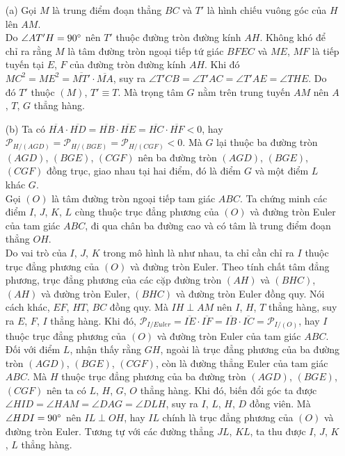     \begin{solution}
        \hfill
        \begin{enumerate}
            \item[(a)] Gọi \(M\) là trung điểm đoạn thẳng \(BC\) và \(T'\) là hình chiếu vuông góc của \(H\) lên \(AM\).\\
            Do \(\angle AT'H = 90 \degree\) nên \(T'\) thuộc đường tròn đường kính \(AH\). Không khó để chỉ ra rằng \(M\) là tâm đường tròn ngoại tiếp tứ giác \(BFEC\) và \(ME\), \(MF\) là tiếp tuyến tại \(E\), \(F\) của đường tròn đường kính \(AH\). Khi đó \(MC^2 = ME^2 = \overline{MT'} \cdot \overline{MA}\), suy ra \(\angle T'CB = \angle T'AC = \angle T'AE = \angle THE\). Do đó \(T'\) thuộc \((M)\), \(T' \equiv T\). Mà trọng tâm \(G\) nằm trên trung tuyến \(AM\) nên \(A\), \(T\), \(G\) thẳng hàng.
            \item[(b)] Ta có \(\overline{HA} \cdot \overline{HD} = \overline{HB} \cdot \overline{HE} = \overline{HC} \cdot \overline{HF} < 0\), hay \(\mathcal{P}_{H/(AGD)} = \mathcal{P}_{H/(BGE)} = \mathcal{P}_{H/(CGF)} < 0\). Mà \(G\) lại thuộc ba đường tròn \((AGD)\), \((BGE)\), \((CGF)\) nên ba đường tròn \((AGD)\), \((BGE)\), \((CGF)\) đồng trục, giao nhau tại hai điểm, đó là điểm \(G\) và một điểm \(L\) khác \(G\).\\
            Gọi \((O)\) là tâm đường tròn ngoại tiếp tam giác \(ABC\). Ta chứng minh các điểm \(I\), \(J\), \(K\), \(L\) cùng thuộc trục đẳng phương của \((O)\) và đường tròn Euler của tam giác \(ABC\), đi qua chân ba đường cao và có tâm là trung điểm đoạn thẳng \(OH\).\\
            Do vai trò của \(I\), \(J\), \(K\) trong mô hình là như nhau, ta chỉ cần chỉ ra \(I\) thuộc trục đẳng phương của \((O)\) và đường tròn Euler. Theo tính chất tâm đẳng phương, trục đẳng phương của các cặp đường tròn \((AH)\) và \((BHC)\), \((AH)\) và đường tròn Euler, \((BHC)\) và đường tròn Euler đồng quy. Nói cách khác, \(EF\), \(HT\), \(BC\) đồng quy. Mà \(IH \perp AM\) nên \(I\), \(H\), \(T\) thẳng hàng, suy ra \(E\), \(F\), \(I\) thẳng hàng. Khi đó, \(\mathcal{P}_{I/Euler} = \overline{IE} \cdot \overline{IF} = \overline{IB} \cdot \overline{IC} = \mathcal{P}_{I/(O)}\), hay \(I\) thuộc trục đẳng phương của \((O)\) và đường tròn Euler của tam giác \(ABC\).\\
            Đối với điểm \(L\), nhận thấy rằng \(GH\), ngoài là trục đẳng phương của ba đường tròn \((AGD)\), \((BGE)\), \((CGF)\), còn là đường thẳng Euler của tam giác \(ABC\). Mà \(H\) thuộc trục đẳng phương của ba đường tròn \((AGD)\), \((BGE)\), \((CGF)\) nên ta có \(L\), \(H\), \(G\), \(O\) thẳng hàng. Khi đó, biến đổi góc ta được \(\angle HID = \angle HAM = \angle DAG = \angle DLH\), suy ra \(I\), \(L\), \(H\), \(D\) đồng viên. Mà \(\angle HDI = 90 \degree\) nên \(IL \perp OH\), hay \(IL\) chính là trục đẳng phương của \((O)\) và đường tròn Euler. Tương tự với các đường thẳng \(JL\), \(KL\), ta thu được \(I\), \(J\), \(K\), \(L\) thẳng hàng.
        \end{enumerate}
    \end{solution}

